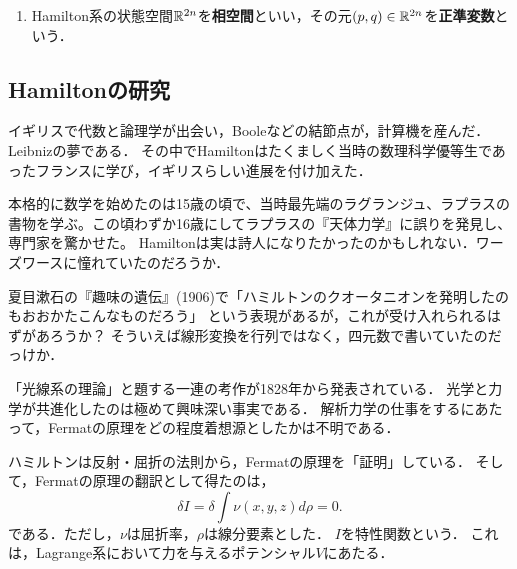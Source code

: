 \documentclass[uplatex, dvipdfmx]{jsreport}
\begin{document}
\begin{definition}\mbox{}
    \begin{enumerate}
        \item Hamilton系の状態空間$\mathbb{R}^{2n}$を\textbf{相空間}といい，その元$(p,q)\in\mathbb{R}^{2n}$を\textbf{正準変数}という．
    \end{enumerate}
\end{definition}


\subsection{Hamiltonの研究}

\begin{tcolorbox}[colframe=ForestGreen, colback=ForestGreen!10!white,breakable,colbacktitle=ForestGreen!40!white,coltitle=black,fonttitle=\bfseries\sffamily,
title=]
    
\end{tcolorbox}

\begin{history}
    イギリスで代数と論理学が出会い，Booleなどの結節点が，計算機を産んだ．Leibnizの夢である．
    その中でHamiltonはたくましく当時の数理科学優等生であったフランスに学び，イギリスらしい進展を付け加えた．

    本格的に数学を始めたのは15歳の頃で、当時最先端のラグランジュ、ラプラスの書物を学ぶ。この頃わずか16歳にしてラプラスの『天体力学』に誤りを発見し、専門家を驚かせた。
    Hamiltonは実は詩人になりたかったのかもしれない．ワーズワースに憧れていたのだろうか．
\end{history}
\begin{remark}
    夏目漱石の『趣味の遺伝』(1906)で「ハミルトンのクオータニオンを発明したのもおおかたこんなものだろう」
という表現があるが，これが受け入れられるはずがあろうか？
そういえば線形変換を行列ではなく，四元数で書いていたのだっけか．
\end{remark}


\begin{history}[Hamiltonの光学研究]
    「光線系の理論」と題する一連の考作が1828年から発表されている．
    光学と力学が共進化したのは極めて興味深い事実である．
    解析力学の仕事をするにあたって，Fermatの原理をどの程度着想源としたかは不明である．

    ハミルトンは反射・屈折の法則から，Fermatの原理を「証明」している．
    そして，Fermatの原理の翻訳として得たのは，
    \[\delta I=\delta\int\nu(x,y,z)d\rho=0.\]
    である．ただし，$\nu$は屈折率，$\rho$は線分要素とした．
    $I$を特性関数という．
    これは，Lagrange系において力を与えるポテンシャル$V$にあたる．
\end{history}
\end{document}

